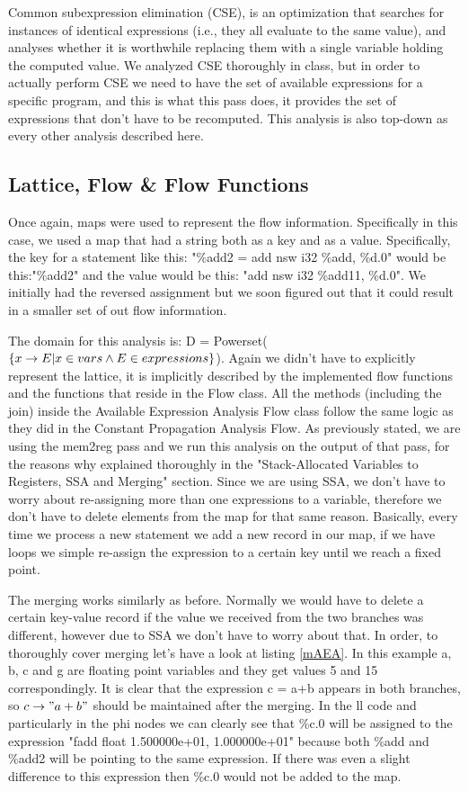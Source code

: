 Common subexpression elimination (CSE), is an optimization that searches for instances of identical expressions (i.e., they all evaluate to the same value), and analyses whether it is worthwhile replacing them with a single variable holding the computed value. We analyzed CSE thoroughly in class, but in order to actually perform CSE we need to have the set of available expressions for a specific program, and this is what this pass does, it provides the set of expressions that don't have to be recomputed. This analysis is also top-down as every other analysis described here.


\subsection*{Lattice, Flow \& Flow Functions}

Once again, maps were used to represent the flow information. Specifically in this case, we used a map that had a string both as a key and as a value. Specifically, the key for a statement like this: "\%add2 = add nsw i32 \%add, \%d.0" would be this:"\%add2" and the value would be this: "add nsw i32 \%add11, \%d.0". We initially had the reversed assignment but we soon figured out that it could result in a smaller set of out flow information.

The domain for this analysis is: D = Powerset($\{x\rightarrow E|x\in vars \wedge E\in expressions\}$). Again we didn't have to explicitly represent the lattice, it is implicitly described by the implemented flow functions and the functions that reside in the Flow class. All the methods (including the join) inside the Available Expression Analysis Flow class follow the same logic as they did in the Constant Propagation Analysis Flow. As previously stated, we are using the mem2reg pass and we run this analysis on the output of that pass, for the reasons why explained thoroughly in the "Stack-Allocated Variables to Registers, SSA and Merging" section. Since we are using SSA, we don't have to worry about re-assigning more than one expressions to a variable, therefore we don't have to delete elements from the map for that same reason. Basically, every time we process a new statement we add a new record in our map, if we have loops we simple re-assign the expression to a certain key until we reach a fixed point.



The merging works similarly as before. Normally we would have to delete a certain key-value record if the value we received from the two branches was different, however due to SSA we don't have to worry about that. In order, to thoroughly cover merging let's have a look at listing \ref{mAEA}. In this example a, b, c and g are floating point variables and they get values 5 and 15 correspondingly. It is clear that the expression c = a+b appears in both branches, so $c\rightarrow"a+b"$ should be maintained after the merging. In the ll code and particularly in the phi nodes we can clearly see that \%c.0 will be assigned to the expression "fadd float 1.500000e+01, 1.000000e+01" because both \%add and \%add2 will be pointing to the same expression. If there was even a slight difference to this expression then \%c.0 would not be added to the map.


